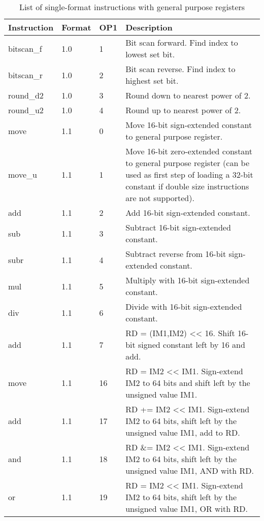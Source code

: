\documentclass[forwardcom.tex]{subfiles}
\begin{document}
\begin{longtable} {|p{20mm}|p{10mm}|p{8mm}|p{75mm}|}
\caption{List of single-format instructions with general purpose registers} 
\label{table:ListOfSingleFormatInstructionsGP} \\
\endfirsthead
\endhead
\hline
\bfseries Instruction & \bfseries Format &\bfseries OP1 & \bfseries Description \\
\hline
bitscan\_f    & 1.0   &  1 & Bit scan forward. Find index to lowest set bit. \\
bitscan\_r    & 1.0   &  2 & Bit scan reverse. Find index to highest set bit. \\
round\_d2     & 1.0   &  3 & Round down to nearest power of 2. \\
round\_u2     & 1.0   &  4 & Round up to nearest power of 2. \\
move          & 1.1   &  0 & Move 16-bit sign-extended constant to general purpose register. \\
move\_u       & 1.1   &  1 & Move 16-bit zero-extended constant to general purpose register 
(can be used as first step of loading a 32-bit constant if double size
instructions are not supported). \\
add           & 1.1   &  2  & Add 16-bit sign-extended constant. \\
sub           & 1.1   &  3  & Subtract 16-bit sign-extended constant. \\
subr          & 1.1   &  4  & Subtract reverse from 16-bit sign-extended constant. \\
mul           & 1.1   &  5  & Multiply with 16-bit sign-extended constant. \\
div           & 1.1   &  6  & Divide with 16-bit sign-extended constant. \\
add           & 1.1   &  7  & RD = (IM1,IM2) \textless\textless{} 16. Shift 16-bit signed constant left by 16 and add. \\
move          & 1.1   & 16  & RD = IM2 \textless\textless{} IM1. Sign-extend IM2 to 64 bits and shift left by the unsigned value IM1. \\
add           & 1.1   & 17  & RD += IM2 \textless\textless{} IM1. Sign-extend IM2 to 64 bits, shift left by the unsigned value IM1, add to RD. \\
and           & 1.1   & 18  & RD \&= IM2 \textless\textless{} IM1. Sign-extend IM2 to 64 bits, shift left by the unsigned value IM1, AND with RD. \\
or            & 1.1   & 19  & RD \textbar{}= IM2 \textless\textless{} IM1. Sign-extend IM2 to 64 bits, shift left by the unsigned value IM1, OR with RD. \\

\end{longtable}
\end{document}
